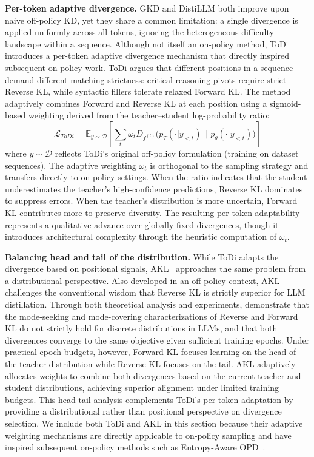 \documentclass{article} %
\newcommand{\ptheta}{p_\theta}
\newcommand{\pteacher}{p_T}
\begin{document}
\textbf{Per-token adaptive divergence.}
GKD and DistiLLM both improve upon naive off-policy KD, yet they share a common limitation: a single divergence is applied uniformly across all tokens, ignoring the heterogeneous difficulty landscape within a sequence. Although not itself an on-policy method, ToDi~\citep{2505.16297} introduces a per-token adaptive divergence mechanism that directly inspired subsequent on-policy work. ToDi argues that different positions in a sequence demand different matching strictness: critical reasoning pivots require strict Reverse KL, while syntactic fillers tolerate relaxed Forward KL. The method adaptively combines Forward and Reverse KL at each position using a sigmoid-based weighting derived from the teacher--student log-probability ratio:
\begin{equation}
    \mathcal{L}_{ToDi} = \mathbb{E}_{y \sim \mathcal{D}} \left[ \sum_t \omega_t D_{f^{(t)}} \big( \pteacher(\cdot|y_{<t}) \parallel \ptheta(\cdot|y_{<t}) \big) \right]
    \label{eq:todi}
\end{equation}
where $y \sim \mathcal{D}$ reflects ToDi's original off-policy formulation (training on dataset sequences). The adaptive weighting $\omega_t$ is orthogonal to the sampling strategy and transfers directly to on-policy settings. When the ratio indicates that the student underestimates the teacher's high-confidence predictions, Reverse KL dominates to suppress errors. When the teacher's distribution is more uncertain, Forward KL contributes more to preserve diversity. The resulting per-token adaptability represents a qualitative advance over globally fixed divergences, though it introduces architectural complexity through the heuristic computation of $\omega_t$.

\textbf{Balancing head and tail of the distribution.}
While ToDi adapts the divergence based on positional signals, AKL~\citep{2404.02657} approaches the same problem from a distributional perspective. Also developed in an off-policy context, AKL challenges the conventional wisdom that Reverse KL is strictly superior for LLM distillation. Through both theoretical analysis and experiments, \citet{2404.02657} demonstrate that the mode-seeking and mode-covering characterizations of Reverse and Forward KL do not strictly hold for discrete distributions in LLMs, and that both divergences converge to the same objective given sufficient training epochs. Under practical epoch budgets, however, Forward KL focuses learning on the head of the teacher distribution while Reverse KL focuses on the tail. AKL adaptively allocates weights to combine both divergences based on the current teacher and student distributions, achieving superior alignment under limited training budgets. This head-tail analysis complements ToDi's per-token adaptation by providing a distributional rather than positional perspective on divergence selection. We include both ToDi and AKL in this section because their adaptive weighting mechanisms are directly applicable to on-policy sampling and have inspired subsequent on-policy methods such as Entropy-Aware OPD~\citep{2603.07079}.
\end{document}
